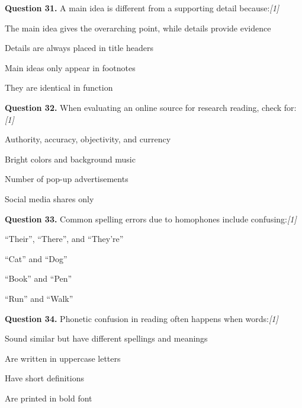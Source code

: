 \documentclass[11pt,a4paper]{article}
\newcommand{\pts}[1]{\hfill   \textit{[#1]}}
\begin{document}
\medskip




\noindent   \textbf{Question 31.} A main idea is different from a supporting detail because:\pts{1}

\begin{parts}
  \item The main idea gives the overarching point, while details provide evidence
  \item Details are always placed in title headers
  \item Main ideas only appear in footnotes
  \item They are identical in function
\end{parts}

\medskip




\noindent   \textbf{Question 32.} When evaluating an online source for research reading, check for:\pts{1}

\begin{parts}
  \item Authority, accuracy, objectivity, and currency
  \item Bright colors and background music
  \item Number of pop-up advertisements
  \item Social media shares only
\end{parts}

\medskip




\noindent   \textbf{Question 33.} Common spelling errors due to homophones include confusing:\pts{1}

\begin{parts}
  \item ``Their'', ``There'', and ``They're''
  \item ``Cat'' and ``Dog''
  \item ``Book'' and ``Pen''
  \item ``Run'' and ``Walk''
\end{parts}

\medskip




\noindent   \textbf{Question 34.} Phonetic confusion in reading often happens when words:\pts{1}

\begin{parts}
  \item Sound similar but have different spellings and meanings
  \item Are written in uppercase letters
  \item Have short definitions
  \item Are printed in bold font
\end{parts}
\end{document}
